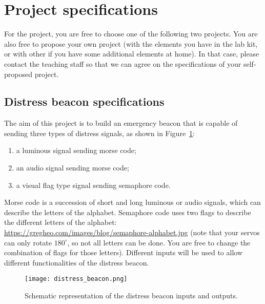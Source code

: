 \section{Project specifications}
\label{sec:project_specifications}

For the project, you are free to choose one of the following two projects. You are also free to propose your own project (with the elements you have in the lab kit, or with other if you have some additional elements at home). In that case, please contact the teaching staff so that we can agree on the specifications of your self-proposed project. 

\subsection{Distress beacon specifications}

The aim of this project is to build an emergency beacon that is capable of sending three types of distress signals, as shown in Figure~\ref{fig:distress_beacon}: 
\begin{enumerate}
	\item a luminous signal sending morse code; 
	\item an audio signal sending morse code; 
	\item a visual flag type signal sending semaphore code. 
\end{enumerate}
Morse code is a succession of short and long luminous or audio signals, which can describe the letters of the alphabet. Semaphore code uses two flags to describe the different letters of the alphabet: \url{https://gregheo.com/images/blog/semaphore-alphabet.jpg} (note that your servos can only rotate $180^{\circ}$, so not all letters can be done. You are free to change the combination of flags for those letters). Different inputs will be used to allow different functionalities of the distress beacon. 

\begin{figure}[h]
	\centering
	\texttt{[image: distress\_beacon.png]}
	\caption{Schematic representation of the distress beacon inputs and outputs. }
	\label{fig:distress_beacon}
\end{figure}

